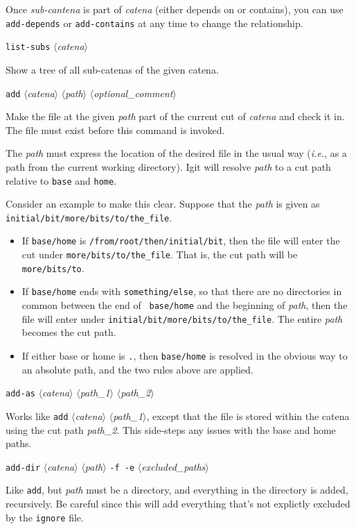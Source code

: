 \documentclass[10pt]{article}
\newcommand{\dotpath}{{\tt\textquotesingle.\textquotesingle}}
\newcommand{\itarg}[1]{\textit{$\langle$#1$\rangle$}}
\begin{document}
{\begin{hang}
Once {\it sub-cantena} is part of {\it catena} (either depends on
or contains), you can use {\tt add-depends} or {\tt add-contains} at
any time to change the relationship.
\end{hang}

{\tt list-subs} \itarg{catena}
\begin{hang}
Show a tree of all sub-catenas of the given catena.
\end{hang}

{\tt add} \itarg{catena} \itarg{path} \itarg{optional\_comment}
\begin{hang}
Make the file at the given {\it path} part of the current cut of
{\it catena} and check it in. The file must exist before this
command is invoked. 
  
The {\it path} must express the location of the desired file in the
usual way ({\it i.e.}, as a path from the current working
directory). Igit will resolve {\it path} to a cut path 
relative to {\tt base} and {\tt home}.
  
Consider an example to make this clear. Suppose that the {\it path}
is given as {\tt initial/bit/more/bits/to/the\_file}.
\begin{itemize}
\setlength\itemsep{0pt}
\item If {\tt base/home} is {\tt /from/root/then/initial/bit},
  then the file will enter the cut under {\tt more/bits/to/the\_file}.
  That is, the cut path will be {\tt more/bits/to}.
\item If {\tt base/home} ends with {\tt something/else}, so that
  there are no directories in common between the end of {\tt
    base/home} and the beginning of {\it path}, then the file will
  enter under {\tt initial/bit/more/bits/to/the\_file}. The entire
  {\it path} becomes the cut path.
\item If either base or home is \dotpath, then {\tt base/home} is
  resolved in the obvious way to an absolute path, and the two
    rules above are applied.
\end{itemize}
\end{hang}
  	
{\tt add-as} \itarg{catena} \itarg{path\_1} \itarg{path\_2}
\begin{hang}
Works like {\tt add} \itarg{catena} \itarg{path\_1}, except that the
file is stored within the catena using the cut path
{\it path\_2}. This side-steps any issues with the base and home
paths.
\end{hang}

{\tt add-dir} \itarg{catena} \itarg{path} {\tt -f -e}
\itarg{excluded\_paths}
\begin{hang}
Like {\tt add}, but {\it path} must be a directory, and everything
in the directory is added, recursively. Be careful since this will add
everything that's not explictly excluded by the {\tt ignore} file.
  

\end{hang}}
\end{document}
